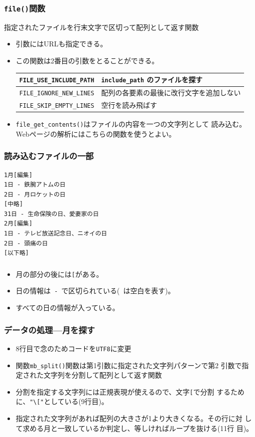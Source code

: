 \begin{frame}[containsverbatim]
\frametitle{\texttt{file()}関数}
指定されたファイルを行末文字で区切って配列として返す関数\\
\begin{itemize}
\item 引数にはURLも指定できる。
\item この関数は2番目の引数をとることができる。
\begin{center}
 \begin{tabular}{|c|m{}|}\hline
 \Verb+FILE_USE_INCLUDE_PATH+ & \Verb+include_path+ のファイルを探す\\\hline
 \Verb+FILE_IGNORE_NEW_LINES+ & 配列の各要素の最後に改行文字を追加しない
      \\ \hline
  \Verb+FILE_SKIP_EMPTY_LINES+&空行を読み飛ばす \\ \hline
 \end{tabular}
\end{center}
 \item \verb+file_get_contents()+はファイルの内容を一つの文字列として
       読み込む。Webページの解析にはこちらの関数を使うとよい。
\end{itemize}
\end{frame}
\begin{frame}[containsverbatim]
\frametitle{読み込むファイルの一部}
\begin{Verbatim}
1月[編集]
1日 - 鉄腕アトムの日
2日 - 月ロケットの日
[中略]
31日 - 生命保険の日、愛妻家の日
2月[編集]
1日 - テレビ放送記念日、ニオイの日
2日 - 頭痛の日
[以下略]
\end{Verbatim}
\end{frame}
\begin{frame}[containsverbatim]
\frametitle{}
\begin{itemize}
 \item 月の部分の後には\texttt{[}がある。
 \item 日の情報は\verb*+ - +で区切られている(\verb*+ +は空白を表す)。
 \item すべての日の情報が入っている。
\end{itemize}
\end{frame}
\begin{frame}[containsverbatim]
\frametitle{データの処理---月を探す}
\begin{itemize}
 \item 8行目で念のためコードを\texttt{UTF8}に変更
 \item 関数\Verb+mb_split()+関数は第1引数に指定された文字列パターンで第2
       引数で指定された文字列を分割して配列として返す関数
 \item 分割を指定する文字列には正規表現が使えるので、文字\Verb+[+で分割
       するために、\Verb+"\["+としている(9行目)。
 \item 指定された文字列があれば配列の大きさが1より大きくなる。その行に対
       して求める月と一致しているか判定し、等しければループを抜ける(11行
       目)。
\end{itemize}
\end{frame}
